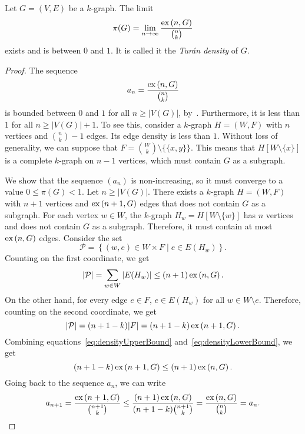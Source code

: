 \begin{theorem}
    Let $G = (V, E)$ be a $k$-graph.
    The limit
    \begin{equation} \label{eq:turan_density}
        \pi(G) = \lim_{n \to \infty} \frac{\text{ex} \left( n, G \right)}{\binom{n}{k}}
    \end{equation}
    exists and is between $0$ and $1$.
    It is called it the \emph{Turán density} of $G$.
    \begin{proof}
        The sequence
        \[
            a_n = \frac{\text{ex} \left( n, G \right)}{\binom{n}{k}}
        \]
        is bounded between $0$ and $1$ for all $n \geq |V(G)|$, by~.
        Furthermore, it is less than $1$ for all $n \geq |V(G)| + 1$.
        To see this, consider a $k$-graph $H = (W, F)$ with $n$ vertices and $\binom{n}{k} - 1$ edges.
        Its edge density is less than $1$.
        Without loss of generality, we can suppose that $F = \binom{W}{k} \setminus \{\{x, y\}\}$.
        This means that $H[W \setminus \{x\}]$ is a complete $k$-graph on $n - 1$ vertices,
        which must contain $G$ as a subgraph.

        We show that the sequence $(a_n)$ is non-increasing, so it must converge to a value $0 \leq \pi(G) < 1$.
        Let $n \geq |V(G)|$.
        There exists a $k$-graph $H = (W, F)$ with $n+1$ vertices and $\text{ex} \left( n+1, G \right)$ edges that does not contain
        $G$ as a subgraph.
        For each vertex $w \in W$, the $k$-graph $H_w = H[W \setminus \{w\}]$ has $n$ vertices
        and does not contain $G$ as a subgraph.
        Therefore, it must contain at most $\text{ex} \left( n, G \right)$ edges.
        Consider the set
        \[
            \mathcal{P} = \left\{ (w, e) \in W \times F \mid e \in E(H_w) \right\}.
        \]
        Counting on the first coordinate, we get
        \begin{equation} \label{eq:densityUpperBound}
            |\mathcal{P}| = \sum_{w \in W} |E(H_w)| \leq (n+1)\, \text{ex} \left( n, G \right).
        \end{equation}
        On the other hand, for every edge $e \in F$, $e \in E(H_w)$
        for all $w \in W \setminus e$.
        Therefore, counting on the second coordinate, we get
        \begin{equation} \label{eq:densityLowerBound}
            |\mathcal{P}| = (n + 1 - k) |F| = (n + 1 - k)\, \text{ex} \left( n+1, G \right).
        \end{equation}
        Combining equations~\eqref{eq:densityUpperBound} and~\eqref{eq:densityLowerBound},
        we get
        \[
            (n + 1 - k)\, \text{ex} \left( n+1, G \right) \leq (n + 1)\, \text{ex} \left( n, G \right).
        \]
        Going back to the sequence $a_n$, we can write
        \[
            a_{n+1} = \frac{\text{ex} \left( n+1, G \right)}{\binom{n+1}{k}} \leq
            \frac{(n + 1)\, \text{ex} \left( n, G \right)}{(n + 1 - k) \binom{n+1}{k}} =
            \frac{\text{ex} \left( n, G \right)}{\binom{n}{k}} = a_n. \qedhere
        \]
    \end{proof}
\end{theorem}

